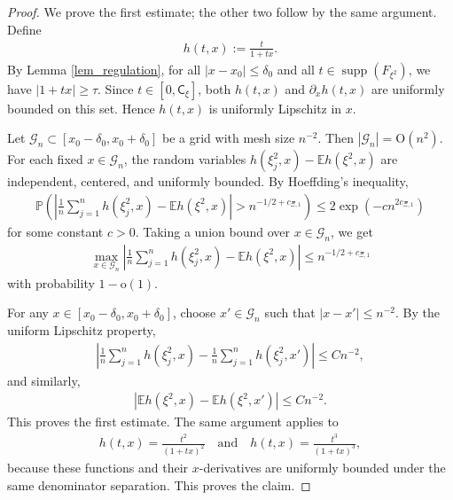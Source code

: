 \documentclass[12pt]{article}
\theoremstyle{plain}
\numberwithin{equation}{section}
\begin{document}
\begin{proof}
	We prove the first estimate; the other two follow by the same argument. Define
	\begin{align*}
		h(t,x):=\frac{t}{1+tx}.
	\end{align*}
	By Lemma \ref{lem_regulation}, for all $|x-x_0|\le \delta_0$ and all
	$t\in \operatorname{supp}(F_{\xi^2})$, we have $|1+tx|\ge \tau.$ Since $t\in[0,\mathsf{C}_\xi]$, both $h(t,x)$ and $\partial_xh(t,x)$ are uniformly bounded on this set. Hence $h(t,x)$ is uniformly Lipschitz in $x$.
	
	Let $\mathcal G_n\subset[x_0-\delta_0,x_0+\delta_0]$ be a grid with mesh size $n^{-2}$. Then $|\mathcal G_n|=\mathrm{O}(n^2)$. For each fixed
	$x\in\mathcal G_n$, the random variables $h(\xi_j^2,x)-\mathbb E h(\xi^2,x)$ are independent, centered, and uniformly bounded. By Hoeffding's inequality,
	\begin{align*}
		\mathbb P\left(\left|\frac1n\sum_{j=1}^n h(\xi_j^2,x)- \mathbb E h(\xi^2,x)\right|>n^{-1/2+c_{\Xi,1}}\right)\leq2\exp(-c n^{2c_{\Xi,1}})
	\end{align*}
	for some constant $c>0$. Taking a union bound over
	$x\in\mathcal G_n$, we get
	\begin{align*}
		\max_{x\in\mathcal G_n}\left|\frac{1}{n}\sum_{j=1}^n h(\xi_j^2,x)-\mathbb E h(\xi^2,x)\right|\leq n^{-1/2+c_{\Xi,1}}
	\end{align*}
	with probability $1-\mathrm{o}(1)$.
	
	For any $x\in[x_0-\delta_0,x_0+\delta_0]$, choose $x'\in\mathcal G_n$ such that $|x-x'|\le n^{-2}.$ By the uniform Lipschitz property,
	\begin{align*}
		\left|\frac{1}{n}\sum_{j=1}^n h(\xi_j^2,x)-\frac{1}{n}\sum_{j=1}^n h(\xi_j^2,x')\right|\leq Cn^{-2},
	\end{align*}
	and similarly,
	\begin{align*}
		\left|\mathbb E h(\xi^2,x)-\mathbb E h(\xi^2,x')\right|\le Cn^{-2}.
	\end{align*}
	This proves the first estimate. The same argument applies to
	\begin{align*}
		h(t,x)=\frac{t^2}{(1+tx)^2}
		\quad\text{and}\quad
		h(t,x)=\frac{t^3}{(1+tx)^3},
	\end{align*}
	because these functions and their $x$-derivatives are uniformly bounded under the same denominator separation. This proves the claim.
\end{proof}
\end{document}
